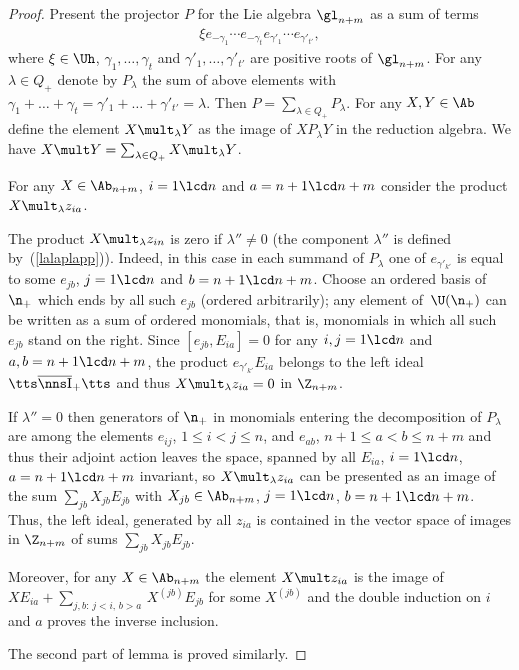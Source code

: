 \documentclass[pdftex]{sigma}
\def\Ib{\tts\overline{\nns\rm I}_+\tts}\def\J{\mathrm{J}}\def\Jb{\,\overline{\!\rm I}_-\ts}\def\k{\mathfrak{k}}
\def\nplus{\mathfrak{n}}\def\nn{\nonumber}\def\nin{\noindent}
\def\s{z}\def\S{\mathrm {S}}\def\si{\sigma}\def\Sp{\S^{\nplus}}\def\sy{\acute{\sigma}}\def\th{\mathring{h}}
\numberwithin{equation}{section}
\begin{document}
\begin{proof}
Present the projector $P$ for the Lie algebra $\gl_{n+m}$ as a sum of terms
\begin{gather}
\label{wedeopro} \xi e_{-\gamma_1}\cdots e_{-\gamma_t}e_{\gamma'_{1}}\cdots e_{\gamma'_{t'}}  ,
\end{gather}
where $\xi\in\Uh$, $\gamma_1,\dots ,\gamma_t$ and $\gamma'_1,\dots ,\gamma'_{t'}$ are positive roots of $\gl_{n+m}$. For any $\lambda\in Q_+$
 denote by $P_\lambda$  the sum of above elements with $\gamma_1+\dots +\gamma_{t}=
\gamma'_1+\dots +\gamma'_{t'}=\lambda$. Then $P=\sum_{\lambda\in Q_+}P_\lambda$.
{} For any $X,Y\in\Ab$ def\/ine the element  $X\mult_\lambda Y$ as the image of $XP_\lambda Y$ in the reduction algebra. We have
$X\mult Y=\sum_{\lambda\in Q_+} X\mult_\lambda Y$.


For any $X\in\Ab_{n+m}$, $i=1\lcd n$ and $a=n+1\lcd n+m$ consider the product $X\mult_\lambda \s_{ia}$.


The product $X\mult_\lambda \s_{in}$ is zero if $\lambda''\not=0$ (the component $\lambda''$ is def\/ined by~(\ref{lalaplapp})).
Indeed, in this case in each summand of $P_\lambda$ one of $e_{\gamma'_{k'}}$ is equal to some $e_{jb}$, $j=1\lcd n$ and $b= n+1\lcd n+m$.
Choose an ordered basis of $\n_+$ which ends by all such $e_{jb}$ (ordered arbitrarily);
any element of~$\U(\n_+)$ can be written as a sum of ordered monomials, that is, monomials in which all such~$e_{jb}$ stand on the right.
Since $[e_{jb},E_{ia}]=0$ for any $i,j=1\lcd n$ and $a,b=n+1\lcd n+m$, the product
$e_{\gamma'_{k'}}E_{ia}$ belongs to the left ideal $\Ib$ and thus $X\mult_\lambda \s_{ia}=0$ in $\Z_{n+m}$.


If $\lambda''=0$ then generators of $\n_+$ in monomials entering the decomposition of  $P_\lambda$ are among the elements $e_{ij}$,
$1\leq i<j\leq n$, and $e_{ab}$, $n+1\leq a<b\leq n+m$ and thus their adjoint action leaves the space, spanned by all $E_{ia}$, $i=1\lcd n$,
$a=n+1\lcd n+m$ invariant, so $X\mult_\lambda \s_{ia}$ can be  presented as an image of the sum $\sum_{jb}X_{jb} E_{jb}$ with $X_{jb}\in\Ab_{n+m}$,
$j=1\lcd n$, $b=n+1\lcd n+m$. Thus, the left ideal, generated by all $\s_{ia}$ is contained in the vector space of images in $\Z_{n+m}$ of  sums
$\sum_{jb}X_{jb} E_{jb}$.


Moreover, for any $X\in\Ab_{n+m}$ the element $X\mult \s_{ia}$ is the image of $XE_{ia}+\sum_{j,b:\, j<i,\, b>a}\, X^{(jb)}E_{jb}$ for some $X^{(jb)}$
and the double induction on $i$ and $a$ proves the inverse inclusion.


The second part of lemma is proved similarly.
\end{proof}
\end{document}
